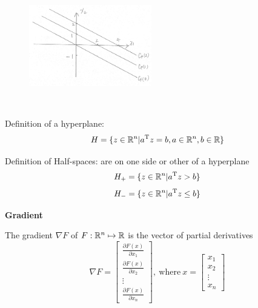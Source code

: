 \begin{figure}
	\centering
	\includegraphics[width=2.1in,height=2.1in]{figures/ch02/p50-3.jpg}
\end{figure}

\vspace{0.3cm}
Definition of a hyperplane:
$$H=\{z\in\mathbb{R}^{n}|a^{{\rm T}} z=b,a\in\mathbb{R}^{n}, b\in\mathbb{R} \}$$

Definition of Half-spaces: are on one side or other of a hyperplane
$$H_{+}=\{z\in\mathbb{R}^{n}|a^{{\rm T}} z>b\}$$
$$H_{-}=\{z\in\mathbb{R}^{n}|a^{{\rm T}} z\leq b\}$$



\vspace{0.5cm}

\textbf{Gradient}

The gradient $\nabla F$ of $F:\mathbb{R}^{n}\mapsto\mathbb{R}$ is the vector of partial derivatives
$$\nabla F= 
\left[ 
\begin{array}{c} 
\frac{\partial F(x)}{\partial x_{1}} \\
\frac{\partial F(x)}{\partial x_{2}} \\
\vdots \\
\frac{\partial F(x)}{\partial x_{n}}
\end{array}
\right],
\ \text{where}\ x= 
\left[ 
\begin{array}{c} 
x_{1} \\
x_{2} \\
\vdots \\
x_{n}
\end{array}
\right]$$

